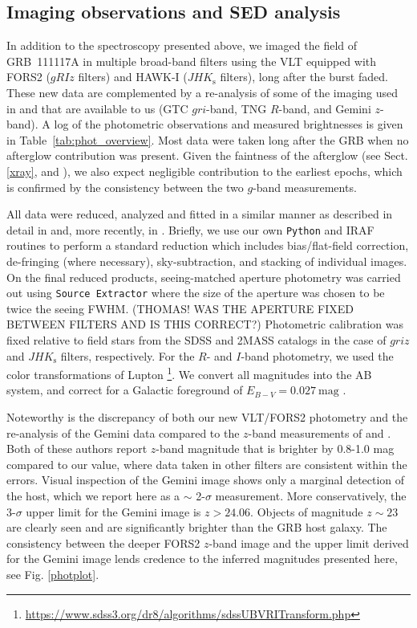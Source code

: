 \documentclass{aa}    %
\begin{document}
\subsection{Imaging observations and SED analysis} \label{SED}

In addition to the spectroscopy presented above, we imaged the field of
GRB~111117A in multiple broad-band filters using the VLT equipped with FORS2
($gRIz$ filters) and HAWK-I ($JHK_{\mathrm{s}}$ filters), long after the burst
faded. These new data are complemented by a re-analysis of some of the imaging
used in \citet{Margutti2012} and \citet{Sakamoto2013} that are available to us
(GTC $gri$-band, TNG $R$-band, and Gemini $z$-band). A log of the photometric
observations and measured brightnesses is given in
Table~\ref{tab:phot_overview}. Most data were taken long after the GRB when no
afterglow contribution was present. Given the faintness of the afterglow (see
Sect. \ref{xray}, and \citealt{Cucchiara2011, Cenko2011}), we also expect
negligible contribution to the earliest epochs, which is confirmed by the
consistency between the two $g$-band measurements.

All data were reduced, analyzed and fitted in a similar manner as described in
detail in \citet{Kruhler2011a} and, more recently, in \citet{Schulze2016}.
Briefly, we use our own \texttt{Python} and IRAF routines to perform a standard
reduction which includes bias/flat-field correction, de-fringing (where
necessary), sky-subtraction, and stacking of individual images. On the final
reduced products, seeing-matched aperture photometry was carried out using
\texttt{Source Extractor} \citep{Bertin1996} where the size of the aperture was
chosen to be twice the seeing FWHM. (THOMAS! WAS THE APERTURE FIXED BETWEEN
FILTERS AND IS THIS CORRECT?) Photometric calibration was fixed relative to
field stars from the SDSS and 2MASS catalogs in the case of $griz$ and
$JHK_{\mathrm{s}}$ filters, respectively. For the $R$- and $I$-band photometry,
we used the color transformations of Lupton%
\footnote{\url{https://www.sdss3.org/dr8/algorithms/sdssUBVRITransform.php}}. We
convert all magnitudes into the AB system, and correct for a Galactic foreground
of $E_{B-V}=0.027~\mathrm{mag}$ \citep{Schlegel1998, Schlafly2011}.

Noteworthy is the discrepancy of both our new VLT/FORS2 photometry and the
re-analysis of the Gemini data compared to the $z$-band measurements of
\citet{Margutti2012} and \citet{Sakamoto2013}. Both of these authors report
$z$-band magnitude that is brighter by 0.8-1.0 mag compared to our value, where
data taken in other filters are consistent within the errors. Visual inspection
of the Gemini image shows only a marginal detection of the host, which we report
here as a $\sim$ 2-$\sigma$ measurement. More conservatively, the 3-$\sigma$
upper limit for the Gemini image is $z > 24.06$. Objects of magnitude $z \sim
23$ are clearly seen and are significantly brighter than the GRB host galaxy.
The consistency between the deeper FORS2 $z$-band image and the upper limit
derived for the Gemini image lends credence to the inferred magnitudes presented
here, see Fig. \ref{photplot}.
\end{document}
